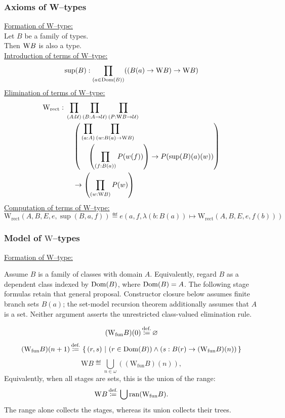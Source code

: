 \subsubsection{Axioms of W--types}
\underline{Formation of W--type:}\\
Let $B$ be a family of types.\\
Then $\mathrm{W} B$ is also a type.\\
\underline{Introduction of terms of W--type:}
\[
\sup(B):\prod_{(a\in \mathrm{Dom}(B))}((B(a)\to\mbox{W}B)\to \mbox{W}B)
\]
\underline{Elimination of terms of W--type:}
\[
\begin{aligned}
\mbox{W}_\mathrm{rect}:{}&
\prod_{(A : \mathcal{U})} \prod_{(B : A \to \mathcal{U})} \prod_{(P : \mathrm{W}B\to \mathcal{U})}\\
&\quad\left(\begin{aligned}
&\prod_{(a : A)} \prod_{(w : B(a) \to \mathrm{W}B)}\\
&\quad\left(\prod_{(f : B(a))} P(w(f))\right)\to P(\sup(B)(a)(w))
\end{aligned}\right)\\
&\quad\to\left(\prod_{(w : \mathrm{W}B)} P(w)\right)
\end{aligned}
\]
\underline{Computation of terms of W--type:}
\[
\mbox{W}_{\mathrm{rect}} (A,B,E,e,\sup(B,a,f))
\eqdef e(a, f, \lambda(b:B(a))\mapsto \mbox{W}_{\mathrm{rect}} (A,B,E,e, f(b)))
\]
\pagebreak
\subsubsection{Model of $\text{W}$--types}
\underline{Formation of W--type:}

Assume $B$ is a family of classes with domain $A$.
Equivalently, regard $B$ as a dependent class indexed by $\mathrm{Dom}(B)$,
where $\mathrm{Dom}(B)=A$.
The following stage formulas retain that general proposal. Constructor
closure below assumes finite branch sets $B(a)$; the set-model recursion
theorem additionally assumes that $A$ is a set. Neither argument asserts
the unrestricted class-valued elimination rule.

\[
(\mathrm{W}_{\mathrm{fun}}B)(0)\,{\stackrel{{\textrm{def.}}}{\coloneqq}}\, \varnothing
\]
\[
(\mathrm{W}_{\mathrm{fun}}B)(n+1)\,{\stackrel{{\textrm{def.}}}{\coloneqq}}\, \left\{\,(r,s)\ \middle|\  (r\in \mathrm{Dom}(B))\land (s:B(r)\to (\mathrm{W}_{\mathrm{fun}}B)(n) )\,\right\}
\]
\[
\mathrm{W}B \eqdef\bigcup_{n\in\omega}((\mathrm{W}_{\mathrm{fun}}B)(n)),
\]
Equivalently, when all stages are sets, this is the union of the range:
\[
\mathrm{W}B \,{\stackrel{{\textrm{def.}}}{\coloneqq}}\,\bigcup\mathrm{ran}(\mathrm{W}_{\mathrm{fun}}B).
\]
The range alone collects the stages, whereas its union collects their trees.

